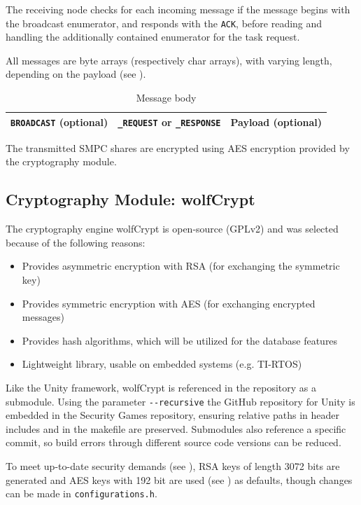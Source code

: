 The receiving node checks for each incoming message if the message begins with the broadcast enumerator, and responds with the \lstinline|ACK|, before reading and handling the additionally contained enumerator for the task request.

All messages are byte arrays (respectively char arrays), with varying length, depending on the payload (see ).

\begin{table}[]
	\centering
	\caption{Message body}
	\label{Message body}
	\begin{tabular}{|l|l|l|}
		\hline
		\lstinline|BROADCAST| (optional) & \lstinline|_REQUEST| or \lstinline|_RESPONSE| & Payload (optional) \\ \hline
	\end{tabular}
\end{table}

The transmitted \gls{SMPC} shares are encrypted using \gls{AES} encryption provided by the cryptography module.

\subsection{Cryptography Module: wolfCrypt} \label{Cryptography Module}

The cryptography engine wolfCrypt is open-source (GPLv2) and was selected because of the following reasons:

\begin{itemize}
	\item Provides asymmetric encryption with \gls{RSA} (for exchanging the symmetric key)
	\item Provides symmetric encryption with \gls{AES} (for exchanging encrypted messages)
	\item Provides hash algorithms, which will be utilized for the database features
	\item Lightweight library, usable on embedded systems (e.g. \gls{TI-RTOS})
\end{itemize}

Like the Unity framework, wolfCrypt is referenced in the repository as a submodule. Using the parameter \lstinline|--recursive| the GitHub repository for Unity is embedded in the Security Games repository, ensuring relative paths in header includes and in the makefile are preserved. Submodules also reference a specific commit, so build errors through different source code versions can be reduced.

To meet up-to-date security demands (see ), \gls{RSA} keys of length 3072 bits are generated and \gls{AES} keys with 192 bit are used (see ) as defaults, though changes can be made in \lstinline|configurations.h|.

